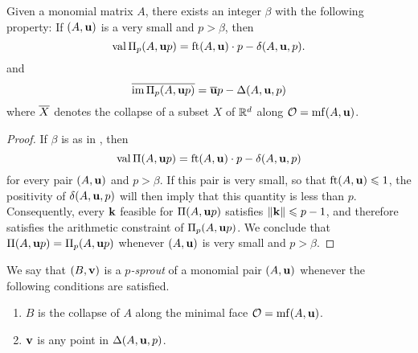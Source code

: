 \documentclass[11pt]{amsart}
\begin{document}

\begin{theorem}
\label{arithmetic uniform value and image: T}   Given a monomial matrix $A$, there exists an integer $\beta$ with the following property\textup:  
If $(A, \mathbf{u})$ is a very small and $p > \beta$, then  \[ \operatorname{val} \Pi_p(A, \mathbf{u}p) = \operatorname{ft}(A, \mathbf{u}) \cdot p - \delta(A, \mathbf{u}, p). \] 
and 
\[ \overline{ \operatorname{im} \Pi_p(A, \mathbf{u}p)} = \overline{\mathbf{u}}p - \Delta(A, \mathbf{u}, p) \] where $\overline{X}$ denotes the collapse of a subset $X$ of $\mathbb{R}^d$ along $\mathcal{O} = \operatorname{mf}(A, \mathbf{u})$.
\end{theorem}

\begin{proof}  If $\beta$ is as in , then \[ \operatorname{val} \Pi(A, \mathbf{u}p) = \operatorname{ft}(A, \mathbf{u}) \cdot p - \delta(A, \mathbf{u}, p) \] for every pair $(A, \mathbf{u})$ and $p > \beta$.  If this pair is very small, so that $\operatorname{ft}(A, \mathbf{u}) \leqslant 1$, the positivity of $\delta(A, \mathbf{u},p)$ will then imply that this quantity is less than $p$.  Consequently, every $\mathbf{k}$ feasible for $\Pi(A, \mathbf{u}p)$ satisfies $\| \mathbf{k} \| \leqslant p-1$, and therefore satisfies the arithmetic constraint of $\Pi_p(A, \mathbf{u}p)$.  We conclude that $\Pi(A, \mathbf{u}p) = \Pi_p(A, \mathbf{u}p)$ whenever $(A, \mathbf{u})$ is very small and $p > \beta$.
\end{proof}



\begin{definition}
\label{p-sprout: D}
We say that $(B, \mathbf{v})$ is a \emph{$p$-sprout} of a monomial pair $(A, \mathbf{u})$ whenever the following conditions are satisfied.
\begin{enumerate}
\item $B$ is the collapse of $A$ along the minimal face $\mathcal{O} = \operatorname{mf}(A, \mathbf{u})$.
\item $\mathbf{v}$ is any point in $\Delta(A, \mathbf{u}, p)$.
\end{enumerate}
\end{definition}
\end{document}
